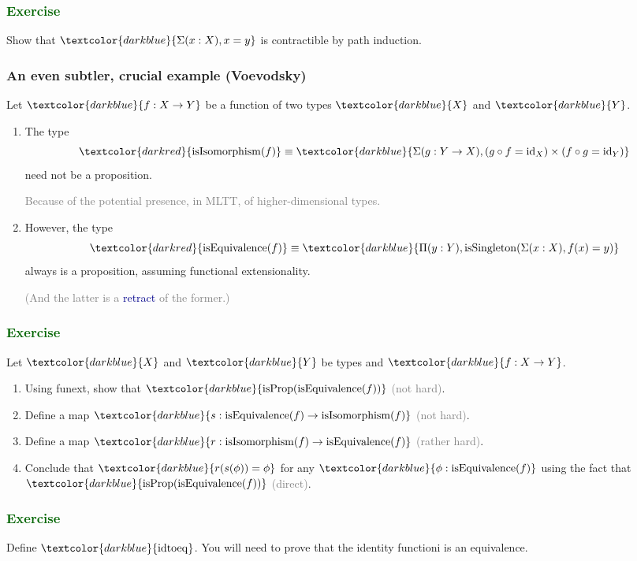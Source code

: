 \documentclass[aspectratio=169]{beamer}
\newcommand{\isProp}{\operatorname{isProp}}
\newcommand{\isSingleton}{\operatorname{isSingleton}}
\newcommand{\isEquivalence}{\operatorname{isEquivalence}}
\newcommand{\isIsomorphism}{\operatorname{isIsomorphism}}
\newcommand{\idtoeq}{\operatorname{idtoeq}}
\newcommand{\eqq}{\equiv}
\newcommand{\db}{\textcolor{darkblue}}
\newcommand{\dg}{\textcolor{darkgreen}}
\newcommand{\grey}{\textcolor{grey}}
\newcommand{\dr}{\textcolor{darkred}}
\newcommand{\m}[1]{$\db{#1}$}
\newcommand{\id}{\operatorname{id}}
\begin{document}
\begin{frame}\frametitle{\dg{Exercise}}

Show that \m{\Sigma(x:X), x = y} is contractible by path induction.

\end{frame}

\begin{frame}
  \frametitle{An even subtler, crucial example (Voevodsky)}

Let \m{f:X \to Y} be a function of two types \m{X} and \m{Y}.
  \begin{enumerate}
  \vfill \item The type \[\dr{\isIsomorphism(f)} \eqq \db{\Sigma(g:Y \to X),  (g \circ f = \id_X) \times (f \circ g = \id_Y)}\] need not be a proposition.

\vfill

\grey{Because of the potential presence, in MLTT, of higher-dimensional types.}

\vfill \item However, the type
\[
\dr{\isEquivalence(f)} \eqq \db{\Pi(y:Y), \isSingleton(\Sigma(x:X), f(x)=y)}
\]
always is a proposition, assuming functional extensionality.

\vfill \grey{(And the latter is a \db{retract} of the former.)}
  \end{enumerate}

\end{frame}

\begin{frame}
  \frametitle{\dg{Exercise}}

Let \m{X} and \m{Y} be types and \m{f:X \to Y}.
 \begin{enumerate}
  \item Using funext, show that \m{\isProp(\isEquivalence(f))} \grey{(not hard)}.
  \item Define a map \m{s : \isEquivalence(f) \to \isIsomorphism(f)} \grey{(not hard)}.
  \item Define a map \m{r : \isIsomorphism(f) \to \isEquivalence(f)} \grey{(rather hard)}.
   \item Conclude that \m{r(s(\phi)) = \phi} for any \m{\phi :
   \isEquivalence(f)} using the fact that \m{\isProp(\isEquivalence(f))} \grey{(direct)}.
  \end{enumerate}

\end{frame}

\begin{frame}
  \frametitle{\dg{Exercise}}

  Define \m{\idtoeq}. You will need to prove that the identity functioni is an equivalence.

\end{frame}
\end{document}

